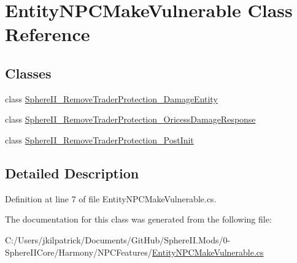 \hypertarget{class_entity_n_p_c_make_vulnerable}{}\section{Entity\+N\+P\+C\+Make\+Vulnerable Class Reference}
\label{class_entity_n_p_c_make_vulnerable}
\subsection*{Classes}
\begin{DoxyCompactItemize}
\item 
class \mbox{\hyperlink{class_entity_n_p_c_make_vulnerable_1_1_sphere_i_i___remove_trader_protection___damage_entity}{Sphere\+I\+I\+\_\+\+Remove\+Trader\+Protection\+\_\+\+Damage\+Entity}}
\item 
class \mbox{\hyperlink{class_entity_n_p_c_make_vulnerable_1_1_sphere_i_i___remove_trader_protection___oricess_damage_response}{Sphere\+I\+I\+\_\+\+Remove\+Trader\+Protection\+\_\+\+Oricess\+Damage\+Response}}
\item 
class \mbox{\hyperlink{class_entity_n_p_c_make_vulnerable_1_1_sphere_i_i___remove_trader_protection___post_init}{Sphere\+I\+I\+\_\+\+Remove\+Trader\+Protection\+\_\+\+Post\+Init}}
\end{DoxyCompactItemize}


\subsection{Detailed Description}


Definition at line 7 of file Entity\+N\+P\+C\+Make\+Vulnerable.\+cs.



The documentation for this class was generated from the following file\+:\begin{DoxyCompactItemize}
\item 
C\+:/\+Users/jkilpatrick/\+Documents/\+Git\+Hub/\+Sphere\+I\+I.\+Mods/0-\/\+Sphere\+I\+I\+Core/\+Harmony/\+N\+P\+C\+Features/\mbox{\hyperlink{_entity_n_p_c_make_vulnerable_8cs}{Entity\+N\+P\+C\+Make\+Vulnerable.\+cs}}\end{DoxyCompactItemize}
